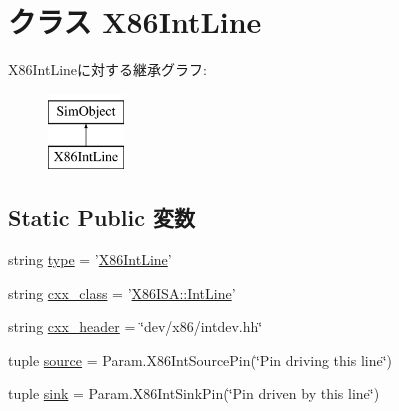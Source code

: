 \hypertarget{classX86IntPin_1_1X86IntLine}{
\section{クラス X86IntLine}
\label{classX86IntPin_1_1X86IntLine}
}
X86IntLineに対する継承グラフ:\begin{figure}[H]
\begin{center}
\leavevmode
\includegraphics[height=2cm]{classX86IntPin_1_1X86IntLine}
\end{center}
\end{figure}
\subsection*{Static Public 変数}
\begin{DoxyCompactItemize}
\item 
string \hyperlink{classX86IntPin_1_1X86IntLine_acce15679d830831b0bbe8ebc2a60b2ca}{type} = '\hyperlink{classX86IntPin_1_1X86IntLine}{X86IntLine}'
\item 
string \hyperlink{classX86IntPin_1_1X86IntLine_a58cd55cd4023648e138237cfc0822ae3}{cxx\_\-class} = '\hyperlink{classX86ISA_1_1IntLine}{X86ISA::IntLine}'
\item 
string \hyperlink{classX86IntPin_1_1X86IntLine_a17da7064bc5c518791f0c891eff05fda}{cxx\_\-header} = \char`\"{}dev/x86/intdev.hh\char`\"{}
\item 
tuple \hyperlink{classX86IntPin_1_1X86IntLine_aa873026052cc3e5ba03877243fcb7ecd}{source} = Param.X86IntSourcePin(\char`\"{}Pin driving this line\char`\"{})
\item 
tuple \hyperlink{classX86IntPin_1_1X86IntLine_ad1dc9221fe6891d39e79ea933df9ff9e}{sink} = Param.X86IntSinkPin(\char`\"{}Pin driven by this line\char`\"{})
\end{DoxyCompactItemize}


